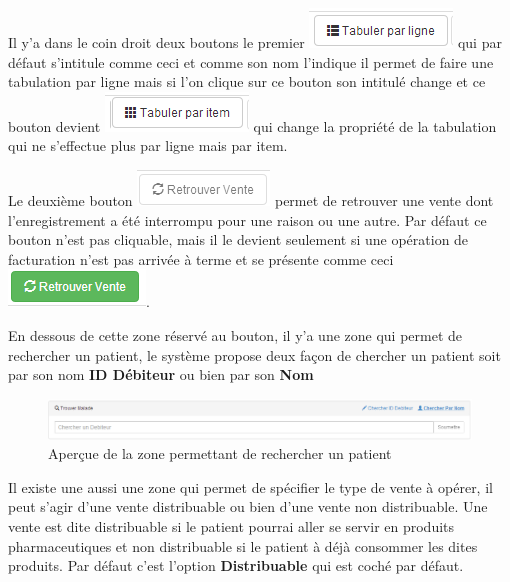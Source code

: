 \documentclass[12pt,a4paper]{report}
\begin{document}
Il y'a dans le coin droit deux boutons le premier \includegraphics[scale=0.7]{pic/tabulerParLigne.png}  qui par défaut s'intitule comme ceci et comme son nom l'indique il permet de faire une tabulation par ligne mais si l'on clique sur ce bouton son intitulé change et ce bouton devient 
\includegraphics[scale=0.7]{pic/tabulerParItem.png}  qui change la propriété de la tabulation qui ne s'effectue plus par ligne mais par item. 

Le deuxième bouton \includegraphics[scale=0.7]{pic/RetrouverVente.png}  permet de retrouver une vente dont l'enregistrement a été interrompu pour une raison ou une autre. Par défaut ce bouton n'est pas cliquable, mais il le devient seulement si une opération de facturation n'est pas arrivée à terme et se présente comme ceci \includegraphics[scale=0.7]{pic/RetrouverVenteGreen.png}.

En dessous de cette zone réservé au bouton, il y'a une zone qui permet de rechercher un patient, le système propose deux façon de chercher un patient soit par son nom\textbf{ ID Débiteur} ou bien par son \textbf{Nom} 

\begin{figure}[h]
\begin{center}
\includegraphics[width=14cm]{pic/foundPatient.png}
\end{center}
\caption{Aperçue de la zone permettant de rechercher un patient}
\label{Aperçue de la zone permettant de rechercher un patient}
\end{figure}

Il existe une aussi une zone qui permet de spécifier le type de vente à opérer, il peut s'agir d'une vente distribuable ou bien d'une vente non distribuable. Une vente est dite distribuable si le patient pourrai aller se servir en produits pharmaceutiques et non distribuable si le patient à déjà consommer les dites produits. Par défaut c'est l'option \textbf{Distribuable} qui est coché par défaut.  
\end{document}
